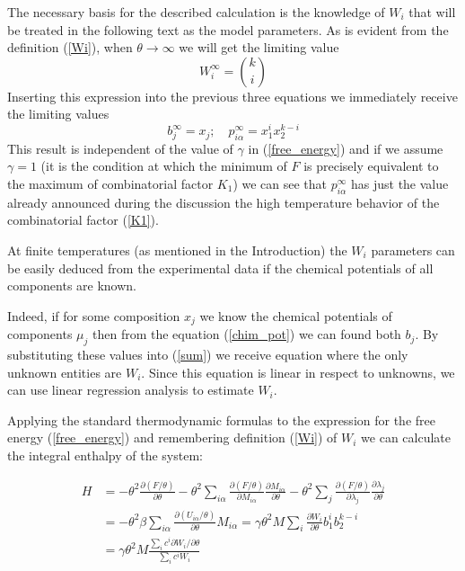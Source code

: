 \documentclass[12pt,abstract]{scrartcl}
\begin{document}
The necessary basis for the described calculation is the  knowledge of $W_i$ that will be treated in the following text as the model parameters. As is evident from the definition (\ref{Wi}), when $\theta \to \infty$ we will get the limiting value $$W_i^\infty = \binom{k}{i}$$
Inserting this expression into the previous three equations we immediately receive the limiting values
$$ b_j^\infty = x_j; \quad p_{i \alpha}^\infty = x_1^i x_2^{k-i}$$
This result is independent of the value of $\gamma$ in (\ref{free_energy}) and if we assume $\gamma = 1$ (it is the condition at which the minimum of $F$  is precisely equivalent to the maximum of combinatorial factor $K_1$) we can see that $p_{i \alpha}^\infty$ has just the value already announced during the discussion the high temperature behavior of the  combinatorial  factor (\ref{K1}).

At finite temperatures (as mentioned in the Introduction) the  $W_i$ parameters can be easily deduced from the experimental data if the chemical potentials of all components are known.

Indeed, if for some composition $x_j$ we know the chemical potentials of components $\mu_j$ then from the equation (\ref{chim_pot}) we can found both $b_j$. By substituting these values into  (\ref{sum}) we receive equation where the only unknown entities are $W_i$. Since this equation is linear in respect to unknowns, we can use linear regression analysis \cite{Regression2016} to estimate $W_i$.

Applying the standard thermodynamic formulas \cite{Prigogine1954} to the expression for the free energy (\ref{free_energy}) and remembering definition (\ref{Wi}) of $W_i$  we can calculate the integral enthalpy of the system:

\begin{equation} \label{H}
\begin{split}
    H &= - \theta^2 \frac{\partial( F/\theta)}{\partial \theta} - \theta^2 \sum_{i \alpha}\frac{\partial (F/\theta)}{\partial M_{i\alpha}} \frac {\partial M_{i\alpha}} {\partial \theta} - \theta^2 \sum_j\frac{\partial (F/\theta)}{\partial \lambda_j} \frac {\partial \lambda_j} {\partial \theta} \\
    &= - \theta^2 \beta\sum_{i \alpha} \frac{\partial (U_{i \alpha}/\theta)}{\partial \theta} M_{i \alpha}
    = \gamma\theta^2  M \sum_i \frac{\partial W_i}{\partial \theta} b_1^i b_2^{k-i}\\
    &= \gamma\theta^2  M \frac{\sum\limits_i c^i \partial W_i/\partial \theta}{\sum\limits_i c^i W_i }
\end{split}    
\end{equation}
\end{document}
